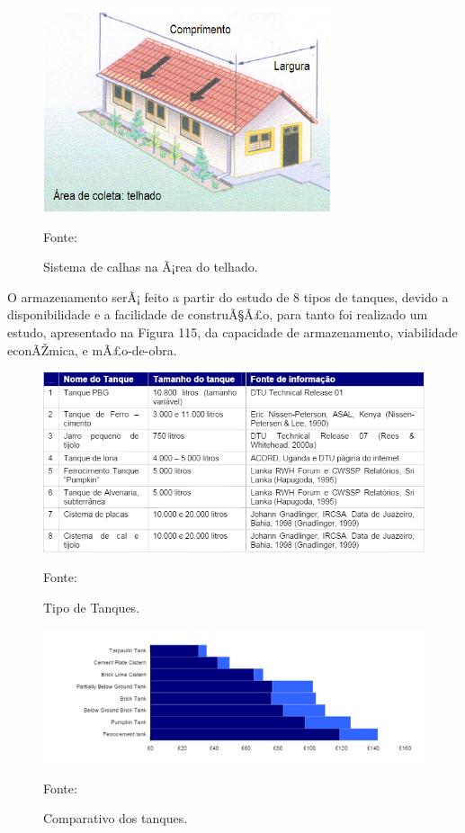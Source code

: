 \begin{figure}[H]
	 \centering
	\label{Sistema de calhas na Ã¡rea do telhado.}
	 \includegraphics[scale=0.6]{captacao/6.png}
	 \caption{Sistema de calhas na Ã¡rea do telhado.}
	 \small{Fonte: \cite{WATERFALL}}
\end{figure}

O armazenamento serÃ¡ feito a partir do estudo de 8 tipos de tanques, devido a disponibilidade e a facilidade de construÃ§Ã£o, para tanto foi realizado um estudo, apresentado na Figura 115, da capacidade de armazenamento, viabilidade econÃŽmica, e mÃ£o-de-obra.

\begin{figure}[H]
	 \centering
	\label{Tipo de Tanques}
	 \includegraphics[scale=0.6]{captacao/7.png}
	 \caption{Tipo de Tanques.}
	 \small{Fonte: \cite{gnadlinger1999technical}}
\end{figure}

\begin{figure}[H]
	 \centering
	\label{Comparativo dos tanques}
	 \includegraphics[scale=0.6]{captacao/8.png}
	 \caption{Comparativo dos tanques.}
	\small{Fonte: \cite{gnadlinger1999technical}}
\end{figure}

